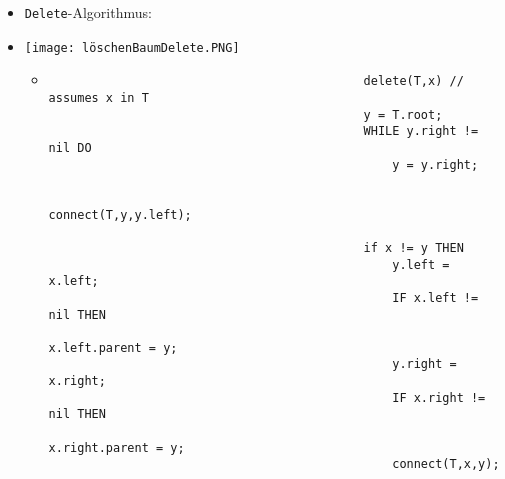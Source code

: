 \begin{itemize}
\begin{itemize}
\begin{itemize}
                            \item \texttt{Delete}-Algorithmus:
                            \item[]
                                \begin{minipage}{0.4\textwidth}
                                    \texttt{[image: löschenBaumDelete.PNG]}
                                \end{minipage}
                                \begin{minipage}{0.5\textwidth}
                                    \begin{itemize}
                                        \item[]
                                            \begin{verbatim}
                                            delete(T,x) // assumes x in T
                                            y = T.root;
                                            WHILE y.right != nil DO 
                                                y = y.right;
                                            
                                            connect(T,y,y.left);

                                            if x != y THEN
                                                y.left = x.left;
                                                IF x.left != nil THEN
                                                    x.left.parent = y;
                                                y.right = x.right;
                                                IF x.right != nil THEN
                                                    x.right.parent = y;
                                                connect(T,x,y);
                                            \end{verbatim}
                                    \end{itemize}
                                \end{minipage}
                        \end{itemize}
                \end{itemize}
    \end{itemize}

\pagebreak

